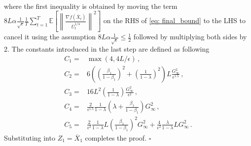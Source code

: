 \documentclass[11pt]{article}
\begin{document}
\begin{align}
\end{align}
where the first inequality is obtained by moving the term ${8L}\alpha\frac{1}{\sqrt{\epsilon}} \frac{1}{T} \sum_{t=1}^T \mathbb E \left[  \left\| \frac{\nabla f(\overline X_{t})}{{\overline U_t^{1/4}}  } \right\|^2 \right] $ on the RHS of \eqref{eq: final_bound} to the LHS to cancel it using the assumption ${8L}\alpha\frac{1}{\sqrt{\epsilon}} \leq \frac{1}{2} $ followed by multiplying both sides by 2.
The constants introduced in the last step are defined as following
\begin{align}
C_1 = & \max (4, 4{L/\epsilon}) \nonumber \, ,\\
C_2 = & 6 \left(\left( \frac{\beta_1}{1-\beta_1}\right)^2 + \left (\frac{1}{1-\lambda} \right)^2 \right)L  \frac{G_{\infty}^2 }{\epsilon^{1.5}}   \nonumber \, ,\\
C_3 = & 16L^2 \left ( \frac{1}{1-\lambda}\right) \frac{G_{\infty}^2}{\epsilon^2} \nonumber \, ,\\
C_4 = &  \frac{2}{ \epsilon^{1.5}}   \frac{1}{1-\lambda}  \left(     \lambda + \frac{\beta_1}{1-\beta_1}    \right){G_{\infty}^2} \nonumber \, ,\\
C_5 = &  \frac{2}{ \epsilon^{2}}   \frac{1}{1-\lambda}   L   \left ( \frac{\beta_1}{1-\beta_1} \right)^2 {G_{\infty}^2}  + \frac{4}{ \epsilon^{2}}   \frac{\lambda}{1-\lambda}   L    {G_{\infty}^2} \nonumber \, .
\end{align}
Substituting into $Z_1 = \overline X_1$ completes the proof. \hfill $\square$
\end{document}
